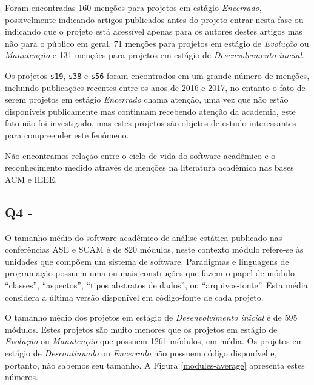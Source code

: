 
Foram encontradas 160 menções para projetos em estágio {\it Encerrado},
possivelmente indicando artigos publicados antes do projeto entrar nesta fase ou indicando que o projeto está acessível apenas para os autores destes artigos mas não para o público em geral,
71 menções para projetos em estágio de {\it Evolução} ou {\it Manutenção} e 
131 menções para projetos em estágio de {\it Desenvolvimento inicial}.

Os projetos \texttt{s19}, \texttt{s38} e \texttt{s56} foram encontrados em um
grande número de menções, incluindo publicações recentes entre os anos de 2016
e 2017, no entanto o fato de serem projetos em estágio {\it Encerrado} chama
atenção, uma vez que não estão disponíveis publicamente mas continuam recebendo
atenção da academia, este fato não foi investigado, mas estes projetos são
objetos de estudo interessantes para compreender este fenômeno.

Não encontramos relação entre o ciclo de vida do software acadêmico e o reconhecimento
medido através de menções na literatura acadêmica nas bases ACM e IEEE.


\subsection{Q4 - \QuestaoQuatro} %

O tamanho médio do software acadêmico de análise estática publicado nas
conferências ASE e SCAM é de 820 módulos, neste contexto módulo refere-se às
unidades que compõem um sistema de software.  Paradigmas e linguagens de
programação possuem uma ou mais construções que fazem o papel de módulo --
``classes'', ``aspectos'', ``tipos abstratos de dados'', ou ``arquivos-fonte''.
Esta média considera a última versão disponível em código-fonte de cada projeto.

O tamanho médio dos projetos em estágio de {\it Desenvolvimento inicial} é de 595
módulos. Estes projetos são muito menores que os projetos em estágio de {\it Evolução} 
ou  {\it Manutenção} que possuem 1261 módulos, em média. 
Os projetos em estágio de {\it Descontinuado} ou {\it Encerrado} não possuem código disponível e,
portanto, não sabemos seu tamanho.
A Figura \ref{modules-average} apresenta estes números.

